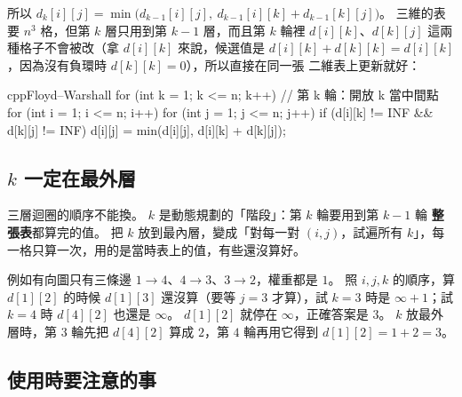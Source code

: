 \begin{center}
\label{fig:sp-fw}
\end{center}

所以 $d_k[i][j] = \min\bigl(d_{k-1}[i][j],\ d_{k-1}[i][k] + d_{k-1}[k][j]\bigr)$。
三維的表要 $n^3$ 格，但第 $k$ 層只用到第 $k - 1$ 層，而且第 $k$ 輪裡
$d[i][k]$、$d[k][j]$ 這兩種格子不會被改（拿 $d[i][k]$ 來說，候選值是
$d[i][k] + d[k][k] = d[i][k]$，因為沒有負環時 $d[k][k] = 0$），所以直接在同一張
二維表上更新就好：

\begin{code}{cpp}{Floyd--Warshall}
for (int k = 1; k <= n; k++) {          // 第 k 輪：開放 k 當中間點
    for (int i = 1; i <= n; i++) {
        for (int j = 1; j <= n; j++) {
            if (d[i][k] != INF && d[k][j] != INF) {
                d[i][j] = min(d[i][j], d[i][k] + d[k][j]);
            }
        }
    }
}
\end{code}

\subsection{$k$ 一定在最外層}

三層迴圈的順序不能換。 $k$ 是動態規劃的「階段」：第 $k$ 輪要用到第 $k - 1$ 輪
\textbf{整張表}都算完的值。 把 $k$ 放到最內層，變成「對每一對 $(i, j)$，試遍所有
$k$」，每一格只算一次，用的是當時表上的值，有些還沒算好。

例如有向圖只有三條邊 $1 \to 4$、$4 \to 3$、$3 \to 2$，權重都是 $1$。 照
$i, j, k$ 的順序，算 $d[1][2]$ 的時候 $d[1][3]$ 還沒算（要等 $j = 3$ 才算），試
$k = 3$ 時是 $\infty + 1$；試 $k = 4$ 時 $d[4][2]$ 也還是 $\infty$。 $d[1][2]$
就停在 $\infty$，正確答案是 $3$。 $k$ 放最外層時，第 $3$ 輪先把 $d[4][2]$ 算成
$2$，第 $4$ 輪再用它得到 $d[1][2] = 1 + 2 = 3$。

\subsection{使用時要注意的事}

